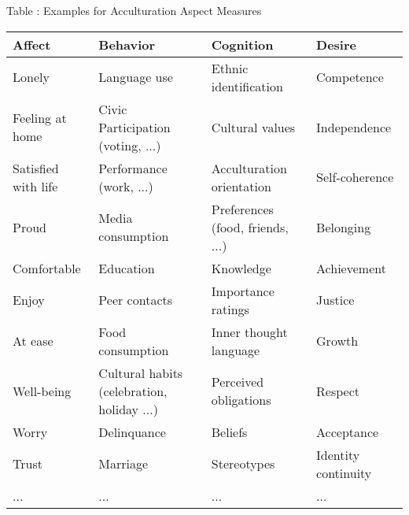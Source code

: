 \begin{table}[hbt!]
\label{tab:Examples}
\smallskip\noindent\small Table \thetable: Examples for Acculturation Aspect Measures \\ 
\begin{tabular}{@{}llll@{}}
\toprule
Affect              & Behavior                                     & Cognition                          & Desire                \\ \midrule
Lonely              & Language   use                               & Ethnic   identification            & Competence            \\
Feeling at home     & Civic   Participation (voting, ...)          & Cultural   values                  & Independence          \\
Satisfied with life & Performance   (work, ...)                    & Acculturation   orientation        & Self-coherence        \\
Proud               & Media   consumption                          & Preferences   (food, friends, ...) & Belonging             \\
Comfortable         & Education                                    & Knowledge                          & Achievement           \\
Enjoy               & Peer   contacts                              & Importance   ratings               & Justice               \\
At ease             & Food   consumption                           & Inner   thought language           & Growth                \\
Well-being          & Cultural   habits (celebration, holiday ...) & Perceived   obligations            & Respect               \\
Worry               & Delinquance                                  & Beliefs                            & Acceptance            \\
Trust               & Marriage                                     & Stereotypes                        & Identity   continuity \\
...                 & ...                                          & ...                                & ...                   \\ \bottomrule
\end{tabular}
\end{table}